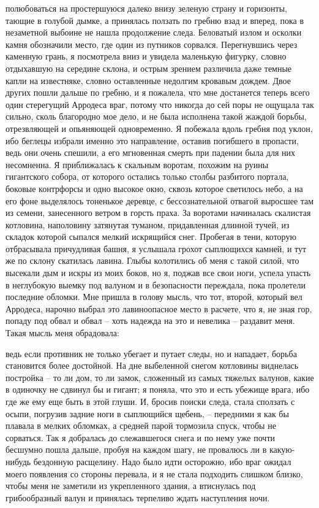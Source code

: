 полюбоваться на простершуюся далеко внизу зеленую страну и горизонты, тающие
в голубой дымке, а принялась  ползать  по  гребню  взад  и  вперед,  пока  в
незаметной  выбоине  не  нашла  продолжение следа. Беловатый излом и осколки
камня обозначили место, где один из путников  сорвался.  Перегнувшись  через
каменную  грань,  я  посмотрела  вниз  и  увидела  маленькую фигурку, словно
отдыхавшую на середине склона, и острым зрением различила даже темные  капли
на  известняке,  словно  оставленные  недолгим  кровавым дождем. Двое других
пошли дальше по гребню, и я пожалела, что мне достанется теперь  всего  один
стерегущий  Арродеса  враг,  потому  что  никогда до сей поры не ощущала так
сильно, сколь благородно мое дело, и не была исполнена такой жаждой  борьбы,
отрезвляющей  и  опьяняющей одновременно. Я побежала вдоль гребня под уклон,
ибо беглецы избрали именно это направление, оставив  погибшего  в  пропасти,
ведь  они  очень  спешили,  а его мгновенная смерть при падении была для них
несомненна. Я приближалась к скальным воротам, похожим на руины  гигантского
собора,  от  которого  остались  только  столбы  разбитого  портала, боковые
контрфорсы и одно высокое окно, сквозь которое светилось небо, а на его фоне
выделялось тоненькое деревце, с  бессознательной  отвагой  выросшее  там  из
семени,  занесенного ветром в горсть праха. За воротами начиналась скалистая
котловина, наполовину затянутая  туманом,  придавленная  длинной  тучей,  из
складок  которой  сыпался  мелкий  искрящийся снег. Пробегая в тени, которую
отбрасывала причудливая башня, я услышала грохот сыплющихся камней, и тут же
по склону скатилась лавина. Глыбы колотились об  меня  с  такой  силой,  что
высекали  дым  и  искры  из  моих  боков, но я, поджав все свои ноги, успела
упасть в неглубокую выемку под валуном  и  в  безопасности  переждала,  пока
пролетели  последние  обломки.  Мне  пришла в голову мысль, что тот, второй,
который вел Арродеса, нарочно выбрал это лавиноопасное место в расчете,  что
я,  не  зная гор, попаду под обвал и обвал -- хоть надежда на это и невелика
-- раздавит меня. Такая мысль меня обрадовала:

ведь если противник не только убегает и путает следы,  но  и  нападает,
борьба  становится  более  достойной.  На  дне  выбеленной  снегом котловины
виднелась постройка -- то ли дом, то ли замок, сложенный  из  самых  тяжелых
валунов,  какие  в одиночку не сдвинул бы и гигант; я поняла, что это и есть
убежище врага, ибо где же ему еще быть в этой глуши. И, бросив поиски следа,
стала сползать с  осыпи,  погрузив  задние  ноги  в  сыплющийся  щебень,  --
передними  я  как  бы  плавала  в мелких обломках, а средней парой тормозила
спуск, чтобы не сорваться. Так я добралась до слежавшегося снега и  по  нему
уже  почти  бесшумно  пошла дальше, пробуя на каждом шагу, не провалюсь ли в
какую-нибудь бездонную расщелину. Надо было идти осторожно, ибо враг  ожидал
моего  появления со стороны перевала, и я не стала подходить слишком близко,
чтобы  меня  не  заметили  из  укрепленного   здания,   а   втиснулась   под
грибообразный валун и принялась терпеливо ждать наступления ночи.

